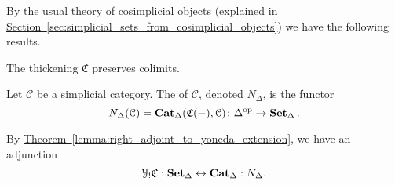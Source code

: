 \documentclass[main.tex]{subfiles}
\begin{document}
By the usual theory of cosimplicial objects (explained in \hyperref[sec:simplicial_sets_from_cosimplicial_objects]{Section~\ref*{sec:simplicial_sets_from_cosimplicial_objects}}) we have the following results.

\begin{lemma}
  \label{lemma:thickening_preserves_colimits}
  The thickening $\mathfrak{C}$ preserves colimits.
\end{lemma}

\begin{definition}
  \label{def:simplicial_nerve}
  Let $\mathcal{C}$ be a simplicial category. The  of $\mathcal{C}$, denoted $N_{\Delta}$, is the functor
  \begin{equation*}
    N_{\Delta}(\mathcal{C}) = \mathbf{Cat}_{\Delta}(\mathfrak{C}(-), \mathcal{C})\colon \Delta^{\mathrm{op}} \to \operatorname{\mathbf{Set}_{\Delta}}.
  \end{equation*}
\end{definition}

By \hyperref[lemma:right_adjoint_to_yoneda_extension]{Theorem~\ref*{lemma:right_adjoint_to_yoneda_extension}}, we have an adjunction
\begin{equation*}
  \mathcal{Y}_{!}\mathfrak{C} : \operatorname{\mathbf{Set}_{\Delta}} \leftrightarrow \operatorname{\mathbf{Cat}_{\Delta}} : N_{\Delta}.
\end{equation*}
\end{document}
